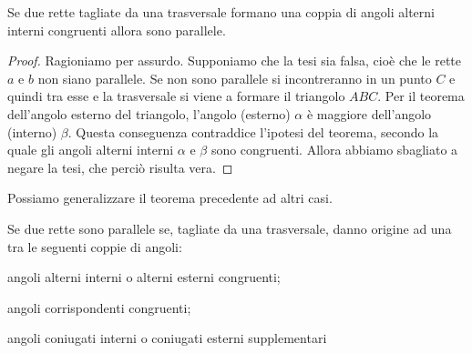 \begin{inaccessibleblock}
    \begin{center}\end{center}
\end{inaccessibleblock}

\begin{teorema}
  Se due rette tagliate da una trasversale formano una coppia di angoli 
  alterni interni congruenti allora sono parallele.
\end{teorema}

\begin{minipage}{.49\textwidth}
\begin{proof}
  Ragioniamo per assurdo. Supponiamo che la tesi sia falsa, cioè che le 
  rette $a$ e $b$ non siano parallele. Se non sono parallele si 
  incontreranno in un punto $C$ e quindi tra esse e la trasversale si 
  viene a formare il triangolo $ABC$. Per il teorema dell'angolo 
  esterno del triangolo, l'angolo (esterno) $\alpha$ è maggiore 
  dell'angolo (interno) $\beta$. Questa conseguenza contraddice 
  l'ipotesi del teorema, secondo la quale gli angoli alterni interni 
  $\alpha$ e $\beta$ sono congruenti. Allora abbiamo sbagliato a negare 
  la tesi, che perciò risulta vera.
\end{proof}
\end{minipage}
\begin{minipage}{.49\textwidth}
\begin{inaccessibleblock}
    \centering
\end{inaccessibleblock}
\end{minipage}


Possiamo generalizzare il teorema precedente ad altri casi.
\begin{teorema}
  Se due rette sono parallele se, tagliate da una trasversale, danno 
origine ad una tra le seguenti coppie di angoli:
  \begin{itemize*}
    \item angoli alterni interni o alterni esterni congruenti;
    \item angoli corrispondenti congruenti;
    \item angoli coniugati interni o coniugati esterni supplementari
  \end{itemize*}
\end{teorema}

